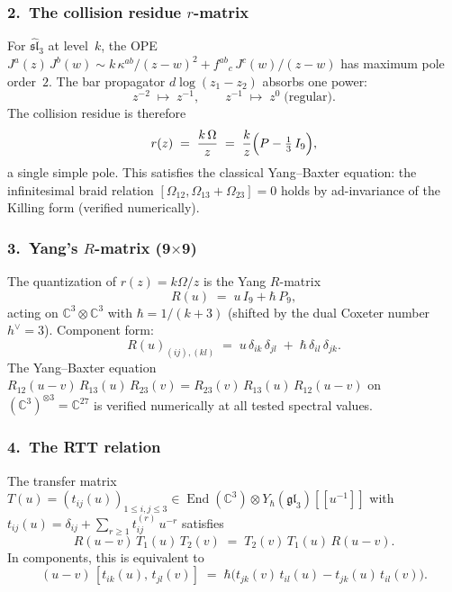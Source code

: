 \subsubsection*{2.\ The collision residue $r$-matrix}

For $\widehat{\mathfrak{sl}}_3$ at level~$k$, the OPE
$J^a(z)\,J^b(w) \sim k\,\kappa^{ab}/(z-w)^2 + f^{ab}{}_c\,J^c(w)/(z-w)$
has maximum pole order~$2$.
The bar propagator $d\log(z_1 - z_2)$ absorbs one power:
\[
 z^{-2} \;\mapsto\; z^{-1}, \qquad
 z^{-1} \;\mapsto\; z^{0}\;\text{(regular)}.
\]
The collision residue is therefore
\begin{equation}\label{eq:sl3-r-matrix}
r(z) \;=\; \frac{k\,\Omega}{z}
\;=\; \frac{k}{z}\Bigl(P - \tfrac{1}{3}\,I_9\Bigr),
\end{equation}
a single simple pole. This satisfies the classical Yang--Baxter equation:
the infinitesimal braid relation
$[\Omega_{12}, \Omega_{13} + \Omega_{23}] = 0$
holds by ad-invariance of the Killing form (verified numerically).

\subsubsection*{3.\ Yang's $R$-matrix (9$\times$9)}

The quantization of $r(z) = k\Omega/z$ is the Yang $R$-matrix
\begin{equation}\label{eq:yang-r-sl3}
R(u) \;=\; u\,I_9 + \hbar\,P_9,
\end{equation}
acting on $\mathbb{C}^3 \otimes \mathbb{C}^3$ with $\hbar = 1/(k + 3)$
(shifted by the dual Coxeter number $h^\vee = 3$).
Component form:
\begin{equation}\label{eq:R-components}
R(u)_{(ij),(kl)}
\;=\; u\,\delta_{ik}\,\delta_{jl}
\;+\; \hbar\,\delta_{il}\,\delta_{jk}.
\end{equation}
The Yang--Baxter equation
$R_{12}(u{-}v)\,R_{13}(u)\,R_{23}(v)
= R_{23}(v)\,R_{13}(u)\,R_{12}(u{-}v)$
on $(\mathbb{C}^3)^{\otimes 3} = \mathbb{C}^{27}$
is verified numerically at all tested spectral values.

\subsubsection*{4.\ The RTT relation}

The transfer matrix
$T(u) = (t_{ij}(u))_{1 \le i,j \le 3}
\in \operatorname{End}(\mathbb{C}^3) \otimes Y_\hbar(\mathfrak{gl}_3)[\![u^{-1}]\!]$
with $t_{ij}(u) = \delta_{ij} + \sum_{r \ge 1} t_{ij}^{(r)}\,u^{-r}$ satisfies
\begin{equation}\label{eq:rtt-sl3}
R(u{-}v)\,T_1(u)\,T_2(v) \;=\; T_2(v)\,T_1(u)\,R(u{-}v).
\end{equation}
In components, this is equivalent to
\begin{equation}\label{eq:rtt-component}
(u - v)\,[t_{ik}(u),\, t_{jl}(v)]
\;=\;
\hbar\bigl(t_{jk}(v)\,t_{il}(u) - t_{jk}(u)\,t_{il}(v)\bigr).
\end{equation}

